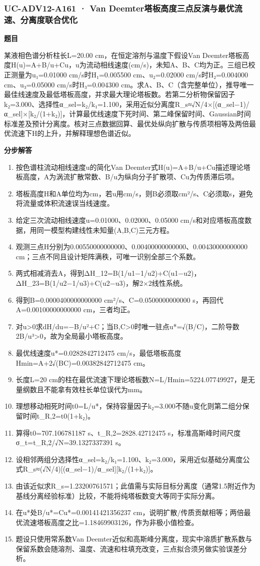 \documentclass[UTF8,11pt,a4paper]{ctexart}
\begin{document}
\subsubsection*{UC-ADV12-A161 · Van Deemter塔板高度三点反演与最优流速、分离度联合优化}
\noindent\textbf{题目}\par
某液相色谱分析柱长L=20.00 cm，在恒定溶剂与温度下假设Van Deemter塔板高度H(u)=A+B/u+Cu，u为流动相线速度(cm/s)，未知A、B、C均为正。三组已校正测量为u₁=0.01000 cm/s时H₁=0.005500 cm、u₂=0.02000 cm/s时H₂=0.004000 cm、u₃=0.05000 cm/s时H₃=0.004300 cm。求A、B、C（含完整单位），推导唯一最佳线速度及最低塔板高度，并求最大理论塔板数。若第二分析物保留因子k₂=3.000、选择性α\_sel=k₂/k₁=1.100，采用近似分离度R\_s≈√N/4×[(α\_sel−1)/α\_sel]×[k₂/(1+k₂)]，计算最优线速度下死时间、第二峰保留时间、Gaussian时间标准差及预计分离度。核对三点数据回算、最优处纵向扩散与传质项相等及两倍最优流速下H的上升，并解释理想色谱近似。\par
\medskip\noindent\textbf{分步解答}
\begin{enumerate}
\item 按色谱柱流动相线速度u的简化Van Deemter式H(u)=A+B/u+Cu描述理论塔板高度，A为涡流扩散常数、B/u为纵向分子扩散项、Cu为传质滞后项。
\item 塔板高度H和A单位均为cm，若u用cm/s，则B必须取cm²/s、C必须取s，避免将流量或体积流速误当线速度。
\item 给定三次流动相线速度u=0.01000、0.02000、0.05000 cm/s和对应塔板高度数据，用同一模型构建线性未知量(A,B,C)三元方程。
\item 观测三点H分别为0.00550000000000、0.00400000000000、0.00430000000000 cm；三点不同且设计矩阵满秩，可唯一识别全部三个系数。
\item 两式相减消去A，得到ΔH\_12=B(1/u1−1/u2)+C(u1−u2)，ΔH\_23=B(1/u2−1/u3)+C(u2−u3)，解2×2线性系统。
\item 得到B=0.0000400000000000 cm²/s、C=0.0500000000000 s，再回代A=0.00100000000000 cm，三者均正。
\item 对u>0求dH/du=−B/u²+C；当B,C>0时唯一驻点u*=√(B/C)，二阶导数2B/u³>0，故为全局最小塔板高度。
\item 最优线速度u*=0.0282842712475 cm/s，最低塔板高度Hmin=A+2√(BC)=0.00382842712475 cm。
\item 长度L=20 cm的柱在最优流速下理论塔板数N=L/Hmin=5224.07749927，是无量纲数且不能拿有效柱长单位误代为mm。
\item 理想移动相死时间t0=L/u*，保持容量因子k₂=3.000不随u变化则第二组分保留时间t\_R,2=t0(1+k₂)。
\item 算得t0=707.106781187 s、t\_R,2=2828.42712475 s，标准高斯峰时间尺度σ\_t=t\_R,2/√N=39.1327337391 s。
\item 设相邻两组分选择性α\_sel=k₂/k₁=1.100、k₂=3.000，采用近似基础分离度公式R\_s≈(√N/4)[(α\_sel−1)/α\_sel][k₂/(1+k₂)]。
\item 由该近似求R\_s=1.23200761571；此值需与实际目标分离度（通常1.5附近作为基线分离经验标准）比较，不能将纯塔板数变大等同于实际分离。
\item 在u*处B/u*=Cu*=0.00141421356237 cm，说明扩散/传质贡献相等；两倍最优流速塔板高度之比=1.18469903126，作为非极小值检查。
\item 题设只使用常系数Van Deemter近似和高斯峰分离度，现实中溶质扩散系数与保留系数会随溶剂、温度、流速和柱填充改变，三点拟合须另做实验误差分析。
\end{enumerate}
\end{document}
